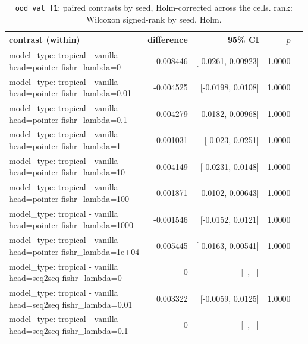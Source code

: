 \documentclass[10pt]{article}
\makeatletter
\newcommand{\stackcell}[1]{\begin{tabular}[t]{@{}l@{}}#1\end{tabular}}
\makeatother
\begin{document}
{\small
\begin{longtable}{lrrrl}
\caption{\texttt{ood\_val\_f1}: paired contrasts by seed, Holm-corrected across the cells. rank: Wilcoxon signed-rank by seed, Holm.}\label{tab:paired-ood_val_f1}\\
\toprule
contrast (within) & difference & 95\% CI & $p$ & \\
\midrule
\endhead
\stackcell{model\_type: tropical - vanilla\\\footnotesize head=pointer fishr\_lambda=0 } & -0.008446 & [-0.0261, 0.00923] & 1.0000 & \\
\stackcell{model\_type: tropical - vanilla\\\footnotesize head=pointer fishr\_lambda=0.01 } & -0.004525 & [-0.0198, 0.0108] & 1.0000 & \\
\stackcell{model\_type: tropical - vanilla\\\footnotesize head=pointer fishr\_lambda=0.1 } & -0.004279 & [-0.0182, 0.00968] & 1.0000 & \\
\stackcell{model\_type: tropical - vanilla\\\footnotesize head=pointer fishr\_lambda=1 } & 0.001031 & [-0.023, 0.0251] & 1.0000 & \\
\stackcell{model\_type: tropical - vanilla\\\footnotesize head=pointer fishr\_lambda=10 } & -0.004149 & [-0.0231, 0.0148] & 1.0000 & \\
\stackcell{model\_type: tropical - vanilla\\\footnotesize head=pointer fishr\_lambda=100 } & -0.001871 & [-0.0102, 0.00643] & 1.0000 & \\
\stackcell{model\_type: tropical - vanilla\\\footnotesize head=pointer fishr\_lambda=1000 } & -0.001546 & [-0.0152, 0.0121] & 1.0000 & \\
\stackcell{model\_type: tropical - vanilla\\\footnotesize head=pointer fishr\_lambda=1e+04 } & -0.005445 & [-0.0163, 0.00541] & 1.0000 & \\
\stackcell{model\_type: tropical - vanilla\\\footnotesize head=seq2seq fishr\_lambda=0 } & 0 & [--, --] & -- & \\
\stackcell{model\_type: tropical - vanilla\\\footnotesize head=seq2seq fishr\_lambda=0.01 } & 0.003322 & [-0.0059, 0.0125] & 1.0000 & \\
\stackcell{model\_type: tropical - vanilla\\\footnotesize head=seq2seq fishr\_lambda=0.1 } & 0 & [--, --] & -- & \\

\end{longtable}}
\end{document}
